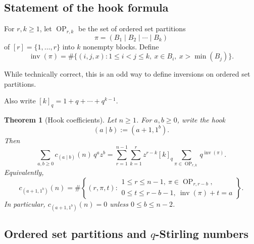\documentclass[12pt]{article}
\newtheorem{theorem}{Theorem}
\DeclareMathOperator{\Hilb}{Hilb}
\DeclareMathOperator{\Inv}{inv}
\DeclareMathOperator{\OP}{OP}
\newcommand{\review}[1]{\begin{reviewbox}#1\end{reviewbox}}
\begin{document}

\date{}



\begin{abstract}
Let \(R_n^{(m)}\) be the diagonal coinvariant algebra of \(\mathfrak S_n\) in
\(m\) sets of \(n\) commuting variables, and write
\[
\Hilb(R_n^{(m)};q_1,\dots,q_m)
=
\sum_{\lambda} c_\lambda(n)s_\lambda(q_1,\dots,q_m).
\]
For hook shapes \(\lambda=(a+1,1^b)\), we give a positive ordered-set-partition
interpretation of \(c_\lambda(n)\).
\end{abstract}

\subsection{Statement of the hook formula}

For \(r,k\geq 1\), let \(\OP_{r,k}\) be the set of ordered set partitions
\[
\pi=(B_1\mid B_2\mid \cdots \mid B_k)
\]
of \([r]=\{1,\dots,r\}\) into \(k\) nonempty blocks. Define
\[
\Inv(\pi)
=
\#\{(i,j,x): 1\leq i<j\leq k,\ x\in B_i,\ x>\min(B_j)\}.
\]

\review{While technically correct, this is an odd way to define inversions on ordered set partitions.}

Also write \([k]_q=1+q+\cdots+q^{k-1}\).

\begin{theorem}[Hook coefficients]
Let \(n\geq 1\). For \(a,b\geq 0\), write the hook
\[
(a\mid b):=(a+1,1^b).
\]
Then
\[
\boxed{
\sum_{a,b\geq 0} c_{(a\mid b)}(n)\,q^a z^b
=
\sum_{r=1}^{n-1}\sum_{k=1}^{r}
z^{r-k}[k]_q
\sum_{\pi\in \OP_{r,k}} q^{\Inv(\pi)}.
}
\]
Equivalently,
\[
\boxed{
c_{(a+1,1^b)}(n)
=
\#\left\{
(r,\pi,t):
\begin{array}{l}
1\leq r\leq n-1,\ \pi\in \OP_{r,r-b},\\
0\leq t\leq r-b-1,\ \Inv(\pi)+t=a
\end{array}
\right\}.
}
\]
In particular, \(c_{(a+1,1^b)}(n)=0\) unless \(0\leq b\leq n-2\).
\end{theorem}

\subsection{Ordered set partitions and \(q\)-Stirling numbers}
\end{document}
